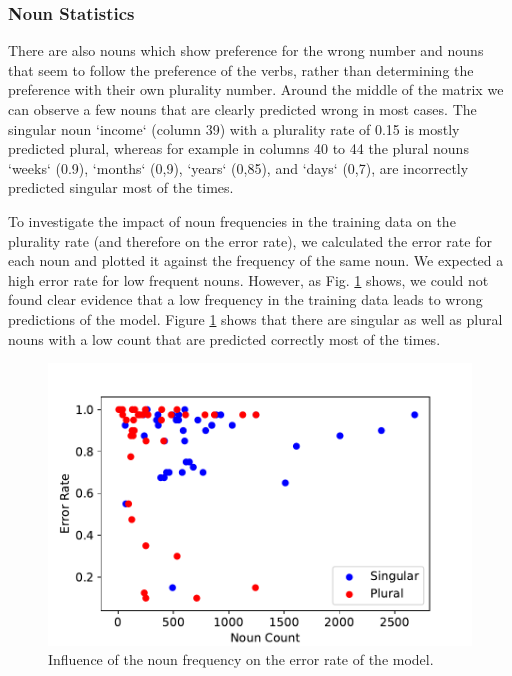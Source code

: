 \subsubsection{Noun Statistics}

There are also nouns which show preference for the wrong number and nouns
that seem to follow the preference of the verbs, 
rather than determining the preference with their own plurality number.
Around the middle of the matrix we can observe a few nouns that are clearly predicted wrong in most cases. The singular noun `income` (column 39) with a plurality rate of 0.15 is mostly predicted plural, whereas for example in columns 40 to 44 the plural nouns `weeks` (0.9), `months` (0,9), `years` (0,85), and `days` (0,7), are incorrectly predicted singular most of the times.

To investigate the impact of noun frequencies in the training data on the plurality rate (and therefore on the error rate), we calculated the error rate for each noun and plotted it against the frequency of the same noun. We expected a high error rate for low frequent nouns. However, as Fig. \ref{fig:noun_freq_error} shows, we could not found clear evidence that a low frequency in the training data leads to wrong predictions of the model. Figure \ref{fig:noun_freq_error} shows that there are singular as well as plural nouns with a low count that are predicted correctly most of the times.

 
         \begin{figure}
          \centering
        \includegraphics[scale=0.5]{noun_freq_error_rate.pdf}
        \caption{Influence of the noun frequency on the error rate of the model.}
        \label{fig:noun_freq_error}
    \end{figure}
    
